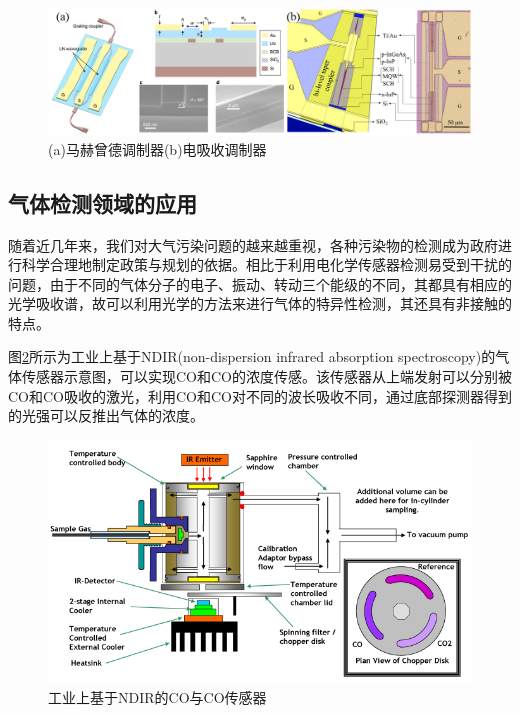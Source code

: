 \begin{figure}[htb]
	\centering
	\includegraphics[width=16cm]{./Pictures/intro_external_modulator.jpg}
	\captionsetup{justification=centering}
	\caption{(a)马赫曾德调制器\cite{he2019high}(b)电吸收调制器\cite{huang2016low}}
	\label{intro_external_modulator}
\end{figure}


\subsection{气体检测领域的应用}

随着近几年来，我们对大气污染问题的越来越重视，各种污染物的检测成为政府进行科学合理地制定政策与规划的依据。相比于利用电化学传感器检测易受到干扰的问题，由于不同的气体分子的电子、振动、转动三个能级的不同，其都具有相应的光学吸收谱，故可以利用光学的方法来进行气体的特异性检测，其还具有非接触的特点。

图\ref{intro_ndir}所示为工业上基于NDIR(non-dispersion infrared absorption spectroscopy)的气体传感器示意图，可以实现CO和CO的浓度传感。该传感器从上端发射可以分别被CO和CO吸收的激光，利用CO和CO对不同的波长吸收不同，通过底部探测器得到的光强可以反推出气体的浓度。

\begin{figure}[htb]
	\centering
	\includegraphics[width=14cm]{./Pictures/intro_ndir.png}
	\captionsetup{justification=centering}
	\caption{工业上基于NDIR的CO与CO传感器\cite{cambustionndir}}
	\label{intro_ndir}
\end{figure}

